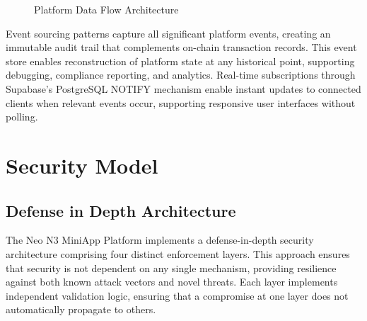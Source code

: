 \documentclass[11pt,a4paper]{article}
\begin{document}
\begin{figure}[h]
\centering
{}
\caption{Platform Data Flow Architecture}
\label{fig:data-flow}
\end{figure}

Event sourcing patterns capture all significant platform events, creating an immutable audit trail that complements on-chain transaction records. This event store enables reconstruction of platform state at any historical point, supporting debugging, compliance reporting, and analytics. Real-time subscriptions through Supabase's PostgreSQL NOTIFY mechanism enable instant updates to connected clients when relevant events occur, supporting responsive user interfaces without polling.

\newpage
\section{Security Model}

\subsection{Defense in Depth Architecture}

The Neo N3 MiniApp Platform implements a defense-in-depth security architecture comprising four distinct enforcement layers. This approach ensures that security is not dependent on any single mechanism, providing resilience against both known attack vectors and novel threats. Each layer implements independent validation logic, ensuring that a compromise at one layer does not automatically propagate to others.
\end{document}
